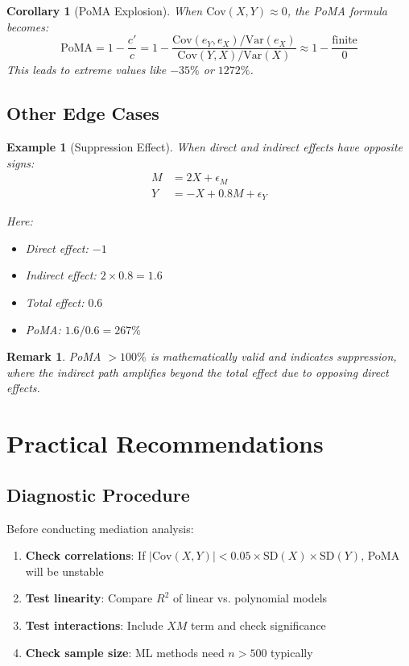 \documentclass[11pt,a4paper]{article}
\newtheorem{corollary}[theorem]{Corollary}
\newtheorem{remark}{Remark}
\newtheorem{example}{Example}
\newcommand{\Var}{\text{Var}}
\newcommand{\Cov}{\text{Cov}}
\begin{document}
\begin{corollary}[PoMA Explosion]
When $\Cov(X,Y) \approx 0$, the PoMA formula becomes:
\begin{equation}
\text{PoMA} = 1 - \frac{c'}{c} = 1 - \frac{\Cov(e_Y, e_X)/\Var(e_X)}{\Cov(Y,X)/\Var(X)} \approx 1 - \frac{\text{finite}}{0}
\end{equation}
This leads to extreme values like $-35\%$ or $1272\%$.
\end{corollary}

\subsection{Other Edge Cases}

\begin{example}[Suppression Effect]
When direct and indirect effects have opposite signs:
\begin{align}
M &= 2X + \epsilon_M \\
Y &= -X + 0.8M + \epsilon_Y
\end{align}

Here:
\begin{itemize}
    \item Direct effect: $-1$
    \item Indirect effect: $2 \times 0.8 = 1.6$
    \item Total effect: $0.6$
    \item PoMA: $1.6/0.6 = 267\%$
\end{itemize}
\end{example}

\begin{remark}
PoMA $> 100\%$ is mathematically valid and indicates suppression, where the indirect path amplifies beyond the total effect due to opposing direct effects.
\end{remark}

\section{Practical Recommendations}

\subsection{Diagnostic Procedure}

Before conducting mediation analysis:

\begin{enumerate}
    \item \textbf{Check correlations}: If $|\Cov(X,Y)| < 0.05 \times \text{SD}(X) \times \text{SD}(Y)$, PoMA will be unstable
    \item \textbf{Test linearity}: Compare $R^2$ of linear vs. polynomial models
    \item \textbf{Test interactions}: Include $XM$ term and check significance
    \item \textbf{Check sample size}: ML methods need $n > 500$ typically
\end{enumerate}
\end{document}

